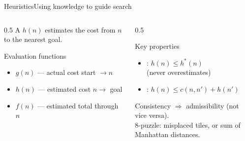 \documentclass[aspectratio=169,11pt]{beamer}
\begin{document}
\begin{frame}{Heuristics}{Using knowledge to guide search}
  \begin{columns}[T]
    \begin{column}{0.5\textwidth}
      A  $h(n)$ estimates the cost from $n$ to the nearest goal.
      \vspace{0.3em}
      \begin{block}{Evaluation functions}
        \small
        \begin{itemize}
          \item $g(n)$ — actual cost start $\to n$
          \item $h(n)$ — estimated cost $n \to$ goal
          \item $f(n)$ — estimated total through $n$
        \end{itemize}
      \end{block}
    \end{column}
    \begin{column}{0.5\textwidth}
      \begin{exampleblock}{Key properties}
        \small
        \begin{itemize}
          \item {}: $h(n) \le h^{\ast}(n)$ \\ (never overestimates)
          \item {}: $h(n) \le c(n,n') + h(n')$
        \end{itemize}
      \end{exampleblock}
      \centering\scriptsize Consistency $\Rightarrow$ admissibility (not vice versa).
      \vspace{0.4em}\\
      \scriptsize 8-puzzle: misplaced tiles, or sum of Manhattan distances.
    \end{column}
  \end{columns}
\end{frame}
\end{document}
